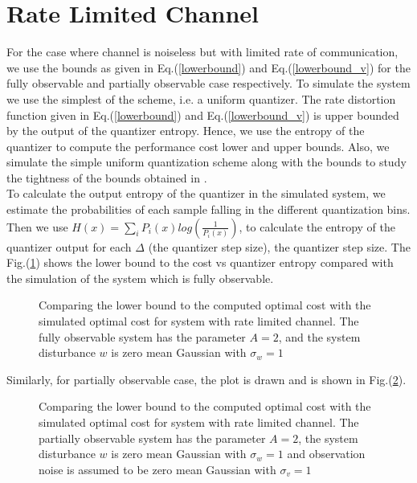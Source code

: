\documentclass[12pt]{caltech_thesis_progress2}
\begin{document}
	\section{Rate Limited Channel}
		For the case where channel is noiseless but with limited rate of communication, we use the bounds as given in Eq.(\ref{lowerbound}) and Eq.(\ref{lowerbound_v}) for the fully observable and partially observable case respectively.  To simulate the system we use the simplest of the scheme, i.e. a uniform quantizer. The rate distortion function given in Eq.(\ref{lowerbound}) and Eq.(\ref{lowerbound_v}) is upper bounded by the output of the quantizer entropy. Hence, we use the entropy of the quantizer to compute the performance cost lower and upper bounds. Also, we simulate the simple uniform quantization scheme along with the bounds to study the tightness of the bounds obtained in \cite{victoria}.
		\\To calculate the output entropy of the quantizer in the simulated system, we estimate the probabilities of each sample falling in the different quantization bins. Then we use $H(x) = \sum\limits_{i} P_{i}(x)log\left(\frac{1}{P_{i}(x)}\right)$, to calculate the entropy of the quantizer output for each $\Delta$ (the quantizer step size), the quantizer step size. 
		The Fig.(\ref{lowerboundQ_sim}) shows the lower bound to the cost vs quantizer entropy compared with the simulation of the system which is fully observable. 
		\begin{figure}[H]
			  \centering
%			  
			  \tiny{
			}
			  \caption{Comparing the lower bound to the computed optimal cost with the simulated optimal cost for system with rate limited channel. The fully observable system has the parameter $A = 2$, and the system disturbance $w$ is zero mean Gaussian with $\sigma_{w} = 1$}
			 \label{lowerboundQ_sim}
		\end{figure}	
		Similarly, for partially observable case, the plot is drawn and is shown in Fig.(\ref{lowerboundQ_sim_v}).
		\begin{figure}[H]
			  \centering
%			  
			  \tiny{
			}
			  \caption{Comparing the lower bound to the computed optimal cost with the simulated optimal cost for system with rate limited channel. The partially observable system has the parameter $A = 2$, the system disturbance $w$ is zero mean Gaussian with $\sigma_{w} = 1$ and observation noise is assumed to be zero mean Gaussian with $\sigma_{v} = 1$}
			 \label{lowerboundQ_sim_v}
		\end{figure}	
\end{document}
